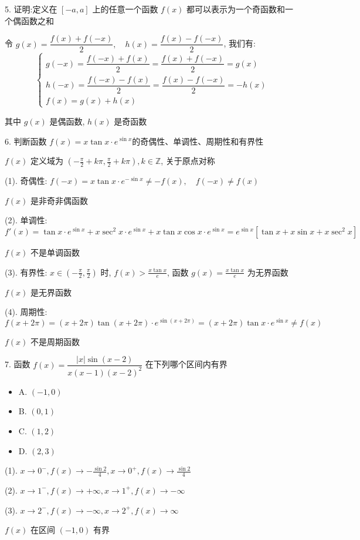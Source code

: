 5. 证明:定义在 $[-a,a]$ 上的任意一个函数 $f(x)$ 都可以表示为一个奇函数和一个偶函数之和
\begin{solution}

	令 $g(x)= \dfrac{f(x)+f(-x)}{2},\quad h(x)=\dfrac{f(x)-f(-x)}{2}$, 我们有:
	$$
	\begin{cases}
		g(-x)=\dfrac{f(-x)+f(x)}{2}=\dfrac{f(x)+f(-x)}{2}=g(x)\\
		h(-x)=\dfrac{f(-x)-f(x)}{2}=\dfrac{f(x)-f(-x)}{2}=-h(x)\\
		f(x) = g(x)+h(x)
	\end{cases}
	$$
	
	其中 $g(x)$ 是偶函数, $h(x)$ 是奇函数
\end{solution}

6. 判断函数 $f(x)=x\tan x\cdot e^{\sin x}$的奇偶性、单调性、周期性和有界性
\begin{solution}

	$f(x)$ 定义域为 $(-\frac{\pi}{2}+k\pi,\frac{\pi}{2}+k\pi),k\in \mathbb{Z}$, 关于原点对称
	
	(1). 奇偶性: $f(-x) = x\tan x\cdot e^{-\sin x}\neq -f(x),\quad f(-x)\neq f(x)$

	$f(x)$ 是非奇非偶函数

	(2). 单调性: $f'(x) = \tan x\cdot e^{\sin x}+x\sec^{2}x\cdot e^{\sin x}+x\tan x\cos x\cdot e^{\sin x}=e^{\sin x}\left[\tan x+x\sin x+x\sec^{2}x\right]$

	$f(x)$ 不是单调函数

	(3). 有界性: $x\in(-\frac{\pi}{2},\frac{\pi}{2})$ 时, $f(x) > \frac{x\tan x}{e}$, 函数 $g(x)=\frac{x\tan x}{e}$ 为无界函数

	$f(x)$ 是无界函数

	(4). 周期性: $f(x+2\pi) = (x+2\pi)\tan(x+2\pi)\cdot e^{\sin(x+2\pi)} = (x+2\pi)\tan x\cdot e^{\sin x} \neq f(x)$

	$f(x)$ 不是周期函数
\end{solution}

7. 函数 $f(x)=\dfrac{|x|\sin(x-2)}{x(x-1)(x-2)^{2}}$ 在下列哪个区间内有界

\begin{itemize}
	\item A. $(-1,0)$
	\item B. $(0,1)$
	\item C. $(1,2)$
	\item D. $(2,3)$
\end{itemize}
\begin{solution}

	(1). $x\to 0^{-}, f(x)\to -\frac{\sin 2}{4}, x\to 0^{+}, f(x)\to \frac{\sin 2}{4}$

	(2). $x\to 1^{-}, f(x)\to +\infty, x\to 1^{+}, f(x)\to -\infty$

	(3). $x\to 2^{-}, f(x)\to -\infty, x\to 2^{+}, f(x)\to \infty$

	$f(x)$ 在区间 $(-1,0)$ 有界
\end{solution}

